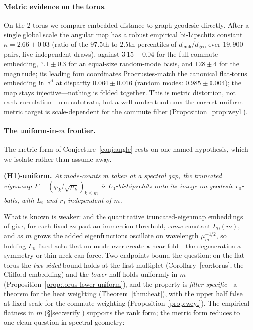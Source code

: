 \documentclass[11pt]{article}
\theoremstyle{remark}
\begin{document}
\paragraph{Metric evidence on the torus.} On the 2-torus we compare embedded
distance to graph geodesic directly. After a single global scale the angular
map has a robust empirical bi-Lipschitz constant $\kappa=2.66\pm0.03$ (ratio of
the $97.5$th to $2.5$th percentiles of $d_{\mathrm{emb}}/d_{\mathrm{geo}}$ over
$19{,}900$ pairs, five independent draws), against $3.15\pm0.04$ for the full
commute embedding, $7.1\pm0.3$ for an equal-size random-mode basis, and
$128\pm4$ for the magnitude; its leading four coordinates Procrustes-match the
canonical flat-torus embedding in $\mathbb{R}^{4}$ at disparity $0.064\pm0.016$
(random modes: $0.985\pm0.004$); the map stays injective---nothing is folded
together. This is metric distortion, not rank correlation---one substrate, but a
well-understood one: the correct uniform metric target is scale-dependent for the
commute filter (Proposition~\ref{prop:weyl}).

\paragraph{The uniform-in-$m$ frontier.} The metric form of
Conjecture~\ref{conj:angle} rests on one named hypothesis, which we isolate
rather than assume away.

\smallskip\noindent\textbf{(H1)-uniform.} \emph{At mode-counts $m$ taken at a
spectral gap, the truncated eigenmap $F=(\varphi_k/\sqrt{\mu_k})_{k\le m}$ is
$L_0$-bi-Lipschitz onto its image on geodesic $r_0$-balls, with $L_0$ and $r_0$
independent of $m$.}

\noindent What is known is weaker: \cite{berard1994} and the quantitative
truncated-eigenmap embeddings of \cite{bates2014,portegies2016} give, for each
fixed $m$ past an immersion threshold, \emph{some} constant $L_0(m)$, and as $m$
grows the added eigenfunctions oscillate on wavelength $\mu_m^{-1/2}$, so holding
$L_0$ fixed asks that no mode ever create a near-fold---the degeneration a
symmetry or thin neck can force. Two endpoints bound the question: on the flat
torus the \emph{two-sided} bound holds at the first multiplet
(Corollary~\ref{cor:torus}, the Clifford embedding) and the \emph{lower} half
holds uniformly in $m$ (Proposition~\ref{prop:torus-lower-uniform}), and the
property is \emph{filter-specific}---a theorem for the heat weighting
(Theorem~\ref{thm:heat}), with the upper half false at fixed scale for the commute
weighting (Proposition~\ref{prop:weyl}). The empirical flatness in $m$
(\S\ref{sec:verify}) supports the rank form; the metric form reduces to one clean
question in spectral geometry:
\end{document}
